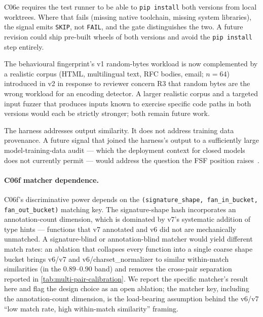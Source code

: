 \documentclass[11pt,letterpaper]{article}
\begin{document}
C06e requires the test runner to be able to \texttt{pip install} both
versions from local worktrees. Where that fails (missing native
toolchain, missing system libraries), the signal emits \texttt{SKIP},
not \texttt{FAIL}, and the gate distinguishes the two. A future
revision could ship pre-built wheels of both versions and avoid the
\texttt{pip install} step entirely.

The behavioural fingerprint's v1 random-bytes workload is now
complemented by a realistic corpus (HTML, multilingual text, RFC
bodies, email; $n=64$) introduced in v2 in response to reviewer
concern R3 that random bytes are the wrong workload for an
encoding detector. A larger realistic corpus and a targeted input
fuzzer that produces inputs known to exercise specific code paths
in both versions would each be strictly stronger; both remain
future work.

The harness addresses output similarity. It does not address training
data provenance. A future signal that joined the harness's output to
a sufficiently large model-training-data audit --- which the
deployment context for closed models does not currently permit ---
would address the question the FSF position
raises~\cite{theregister2026chardet}.

\paragraph{C06f matcher dependence.}
C06f's discriminative power depends on the
\texttt{(signature\_shape, fan\_in\_bucket, fan\_out\_bucket)}
matching key. The signature-shape hash incorporates an
annotation-count dimension, which is dominated by v7's systematic
addition of type hints --- functions that v7 annotated and v6
did not are mechanically unmatched. A signature-blind or
annotation-blind matcher would yield different match rates: an
ablation that collapses every function into a single coarse
shape bucket brings v6/v7 and v6/charset\_normalizer to similar
within-match similarities (in the $0.89$--$0.90$ band) and
removes the cross-pair separation reported in
\cref{tab:multi-pair-calibration}. We report the specific
matcher's result here and flag the design choice as an open
ablation; the matcher key, including the annotation-count
dimension, is the load-bearing assumption behind the v6/v7
``low match rate, high within-match similarity'' framing.
\end{document}
